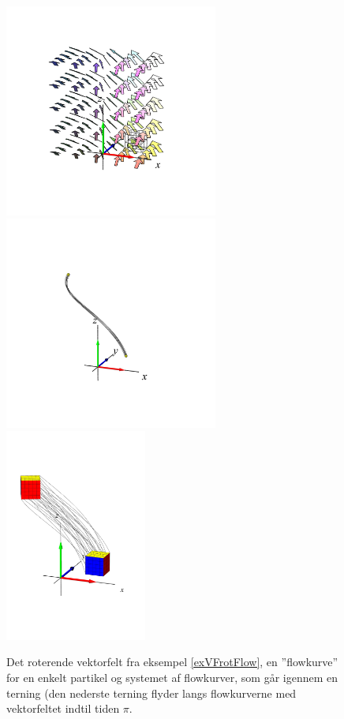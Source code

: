 \begin{figure}[h]
\centerline{\includegraphics[height=70mm]{FIGS/plotVFrot1}\includegraphics[height=70mm]{FIGS/plotVFrot2}\includegraphics[height=70mm]{FIGS/plotVFrot3}}
\begin{center}
\caption{\small{Det roterende vektorfelt fra
eksempel \ref{exVFrotFlow}, en ''flowkurve'' for en enkelt partikel og  systemet af
flowkurver, som går igennem en terning (den nederste terning flyder langs flowkurverne med vektorfeltet indtil tiden $\pi$.}}
\label{figVFrot}
\end{center}
\end{figure}


